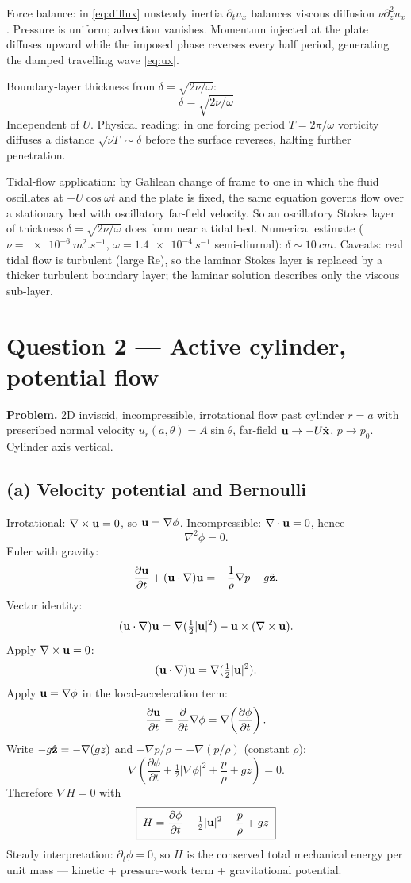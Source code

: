 \documentclass[11pt]{article}
\newcommand{\pd}[2]{\frac{\partial #1}{\partial #2}}
\newcommand{\Lap}{\nabla^{2}}
\begin{document}
Force balance: in \eqref{eq:diffux} unsteady inertia $\partial_t u_x$ balances viscous diffusion $\nu\partial_z^2 u_x$. Pressure is uniform; advection vanishes. Momentum injected at the plate diffuses upward while the imposed phase reverses every half period, generating the damped travelling wave \eqref{eq:ux}.

Boundary-layer thickness from $\delta=\sqrt{2\nu/\omega}$:
\[
\boxed{\;\delta=\sqrt{2\nu/\omega}\;}
\]
Independent of $U$. Physical reading: in one forcing period $T=2\pi/\omega$ vorticity diffuses a distance $\sqrt{\nu T}\sim\delta$ before the surface reverses, halting further penetration.

Tidal-flow application: by Galilean change of frame to one in which the fluid oscillates at $-U\cos\omega t$ and the plate is fixed, the same equation governs flow over a stationary bed with oscillatory far-field velocity. So an oscillatory Stokes layer of thickness $\delta=\sqrt{2\nu/\omega}$ does form near a tidal bed. Numerical estimate ($\nu=\SI{e-6}{m^2.s^{-1}}$, $\omega=\SI{1.4e-4}{s^{-1}}$ semi-diurnal): $\delta\sim\SI{10}{cm}$. Caveats: real tidal flow is turbulent (large $\mathrm{Re}$), so the laminar Stokes layer is replaced by a thicker turbulent boundary layer; the laminar solution describes only the viscous sub-layer.

\section*{Question 2 --- Active cylinder, potential flow}

\textbf{Problem.} 2D inviscid, incompressible, irrotational flow past cylinder $r=a$ with prescribed normal velocity $u_r(a,\theta)=A\sin\theta$, far-field $\vb u\to-U\hat{\vb x}$, $p\to p_0$. Cylinder axis vertical.

\subsection*{(a) Velocity potential and Bernoulli}

Irrotational: $\nabla\times\vb u=0$, so $\vb u=\nabla\phi$. Incompressible: $\nabla\cdot\vb u=0$, hence
\[
\Lap\phi=0.
\]
Euler with gravity:
\[
\pd{\vb u}{t}+(\vb u\cdot\nabla)\vb u=-\frac{1}{\rho}\nabla p-g\hat{\vb z}.
\]
Vector identity:
\[
(\vb u\cdot\nabla)\vb u=\nabla(\tfrac12 |\vb u|^2)-\vb u\times(\nabla\times\vb u).
\]
Apply $\nabla\times\vb u=0$:
\[
(\vb u\cdot\nabla)\vb u=\nabla(\tfrac12|\vb u|^2).
\]
Apply $\vb u=\nabla\phi$ in the local-acceleration term:
\[
\pd{\vb u}{t}=\pd{}{t}\nabla\phi=\nabla\!\left(\pd{\phi}{t}\right).
\]
Write $-g\hat{\vb z}=-\nabla(gz)$ and $-\nabla p/\rho=-\nabla(p/\rho)$ (constant $\rho$):
\[
\nabla\!\left(\pd{\phi}{t}+\tfrac12|\nabla\phi|^2+\frac{p}{\rho}+gz\right)=0.
\]
Therefore $\nabla H=0$ with
\begin{equation}
\boxed{\;H=\pd{\phi}{t}+\tfrac12|\vb u|^2+\frac{p}{\rho}+gz\;}
\label{eq:bernoulli}
\end{equation}
Steady interpretation: $\partial_t\phi=0$, so $H$ is the conserved total mechanical energy per unit mass --- kinetic + pressure-work term + gravitational potential.
\end{document}
